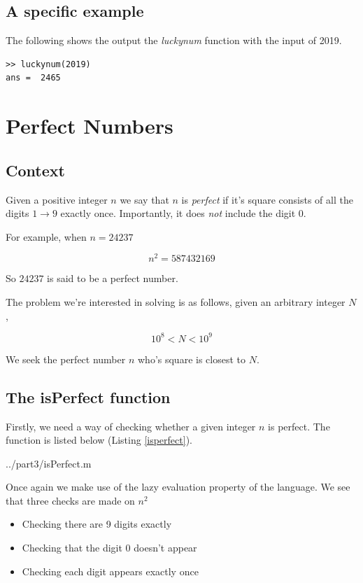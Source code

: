 \documentclass[10pt]{article}
\begin{document}
\subsection{A specific example}

The following shows the output the \emph{luckynum} function with the input of 2019.

\begin{verbatim}
>> luckynum(2019)
ans =  2465
\end{verbatim}

\section{Perfect Numbers}

\subsection{Context}
Given a positive integer $n$ we say that $n$ is \emph{perfect} if it's square consists of all the digits $1 \rightarrow 9$ exactly once. Importantly, it does \emph{not} include the digit $0$.

For example, when $ n = 24237 $

$$ n^2 = 587432169 $$

So $24237$ is said to be a perfect number.

The problem we're interested in solving is as follows, given an arbitrary integer $N$,  

\begin{equation} \label{rangeN}
10^8 < N < 10^{9}
\end{equation}


We seek the perfect number $n$ who's square is closest to $N$.

\subsection{The isPerfect function}

Firstly, we need a way of checking whether a given integer $n$ is perfect. The function is listed below (Listing \ref{isperfect}).

  {../part3/isPerfect.m}
 
 Once again we make use of the lazy evaluation property of the language. We see that three checks are made on $n^2$
 
 \begin{itemize}
 \item Checking there are 9 digits exactly
 \item Checking that the digit $0$ doesn't appear
 \item Checking each digit appears exactly once
 \end{itemize}
 
\end{document}
